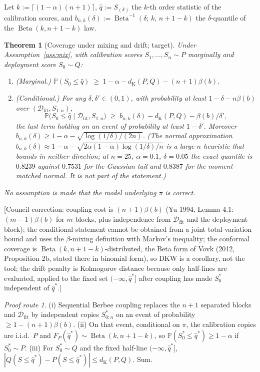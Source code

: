 \documentclass[11pt,a4paper]{article}
\newcommand{\corr}[1]{{\color{ox}\textsf{\small [Council correction: #1]}}}
\newcommand{\target}{{\color{teal}\textsf{\small target}}}
\theoremstyle{plain}
\newtheorem{theorem}{Theorem}
\theoremstyle{definition}
\theoremstyle{remark}
\newtheorem*{route}{Proof route}
\newcommand{\Prob}{\mathbb{P}}
\newcommand{\dK}{d_{\mathrm{K}}}
\DeclareMathOperator{\Beta}{Beta}
\begin{document}
Let $k:=\lceil(1-\alpha)(n+1)\rceil$, $\hat q:=S_{(k)}$ the $k$-th order statistic of the calibration scores, and $b_{n,k}(\delta):=\Beta^{-1}(\delta;\,k,\,n+1-k)$ the $\delta$-quantile of the $\Beta(k,n+1-k)$ law.

\begin{theorem}[Coverage under mixing and drift; \target]\label{thm:cov}
Under Assumption~\ref{ass:mix}, with calibration scores $S_1,\dots,S_n\sim P$ marginally and deployment score $S_0\sim Q$:
\begin{enumerate}[nosep,label=(\roman*)]
\item (Marginal.) $\displaystyle \Prob(S_0\le\hat q)\;\ge\;1-\alpha-\dK(P,Q)-(n+1)\beta(b).$
\item (Conditional.) For any $\delta,\delta'\in(0,1)$, with probability at least $1-\delta-n\beta(b)$ over $(\mathcal D_{\mathrm{fit}},S_{1:n})$,
\[
\Prob\big(S_0\le\hat q\;\big|\;\mathcal D_{\mathrm{fit}},S_{1:n}\big)\;\ge\;b_{n,k}(\delta)-\dK(P,Q)-\beta(b)/\delta',
\]
the last term holding on an event of probability at least $1-\delta'$. Moreover $b_{n,k}(\delta)\ge1-\alpha-\sqrt{\log(1/\delta)/(2n)}$. (The normal approximation $b_{n,k}(\delta)\approx1-\alpha-\sqrt{2\alpha(1-\alpha)\log(1/\delta)/n}$ is a large-$n$ heuristic that bounds in neither direction; at $n=25$, $\alpha=0.1$, $\delta=0.05$ the exact quantile is $0.8239$ against $0.7531$ for the Gaussian tail and $0.8387$ for the moment-matched normal. It is not part of the statement.)
\end{enumerate}
No assumption is made that the model underlying $\pi$ is correct.
\end{theorem}
\corr{coupling cost is $(n+1)\beta(b)$ (Yu 1994, Lemma 4.1: $(m-1)\beta(b)$ for $m$ blocks, plus independence from $\mathcal D_{\mathrm{fit}}$ and the deployment block); the conditional statement cannot be obtained from a joint total-variation bound and uses the $\beta$-mixing definition with Markov's inequality; the conformal coverage is $\Beta(k,n+1-k)$-distributed, the Beta form of Vovk (2012, Proposition 2b, stated there in binomial form), so DKW is a corollary, not the tool; the drift penalty is Kolmogorov distance because only half-lines are evaluated, applied to the fixed set $(-\infty,\hat q^*]$ after coupling has made $S^*_0$ independent of $\hat q^*$.}
\begin{route}
(i) Sequential Berbee coupling replaces the $n+1$ separated blocks and $\mathcal D_{\mathrm{fit}}$ by independent copies $S^*_{0:n}$ on an event of probability $\ge1-(n+1)\beta(b)$. (ii) On that event, conditional on $\pi$, the calibration copies are i.i.d.\ $P$ and $F_P(\hat q^*)\sim\Beta(k,n+1-k)$, so $\Prob(S^*_0\le\hat q^*)\ge1-\alpha$ if $S^*_0\sim P$. (iii) For $S^*_0\sim Q$ and the fixed half-line $(-\infty,\hat q^*]$, $|Q(S\le\hat q^*)-P(S\le\hat q^*)|\le\dK(P,Q)$. Sum.
\end{route}
\end{document}
